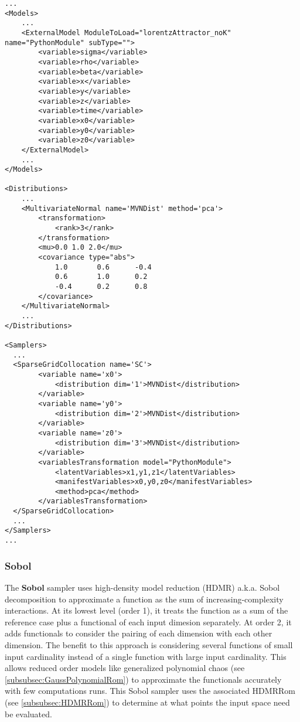 \begin{lstlisting}[style=XML,morekeywords={ND,grid}]
...
<Models>
    ...
    <ExternalModel ModuleToLoad="lorentzAttractor_noK" name="PythonModule" subType="">
        <variable>sigma</variable>
        <variable>rho</variable>
        <variable>beta</variable>
        <variable>x</variable>
        <variable>y</variable>
        <variable>z</variable>
        <variable>time</variable>
        <variable>x0</variable>
        <variable>y0</variable>
        <variable>z0</variable>
    </ExternalModel>
    ...
</Models>

<Distributions>
    ...
    <MultivariateNormal name='MVNDist' method='pca'>
        <transformation>
            <rank>3</rank>
        </transformation>
        <mu>0.0 1.0 2.0</mu>
        <covariance type="abs">
            1.0       0.6      -0.4
            0.6       1.0      0.2
            -0.4      0.2      0.8
        </covariance>
    </MultivariateNormal>
    ...
</Distributions>

<Samplers>
  ...
  <SparseGridCollocation name='SC'>
        <variable name='x0'>
            <distribution dim='1'>MVNDist</distribution>
        </variable>
        <variable name='y0'>
            <distribution dim='2'>MVNDist</distribution>
        </variable>
        <variable name='z0'>
            <distribution dim='3'>MVNDist</distribution>
        </variable>
        <variablesTransformation model="PythonModule">
            <latentVariables>x1,y1,z1</latentVariables>
            <manifestVariables>x0,y0,z0</manifestVariables>
            <method>pca</method>
        </variablesTransformation>
  </SparseGridCollocation>
  ...
</Samplers>
...
\end{lstlisting}

\subsubsection{Sobol}
\label{subsubsubsec:SobolSampler}
The \textbf{Sobol} sampler uses high-density model reduction (HDMR) a.k.a. Sobol decomposition to approximate a function as the sum of increasing-complexity
interactions.  At its lowest level (order 1), it treats the function as a sum of the reference case plus a functional of each input dimesion separately.  At
order 2, it adds functionals to consider the pairing of each dimension with each other dimension.  The benefit to this approach is considering several functions
of small input cardinality instead of a single function with large input cardinality.  This allows reduced order models like generalized polynomial chaos
(see \ref{subsubsec:GaussPolynomialRom}) to approximate the functionals accurately with few computations runs.  This Sobol sampler uses the associated HDMRRom
(see \ref{subsubsec:HDMRRom}) to determine at what points the input space need be evaluated.

